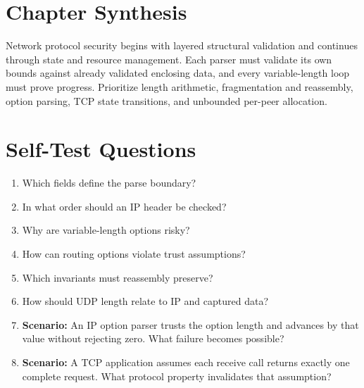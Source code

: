 \documentclass[11pt,letterpaper]{article}
\begin{document}
\section{Chapter Synthesis}
Network protocol security begins with layered structural validation and continues through state and resource management. Each parser must validate its own bounds against already validated enclosing data, and every variable-length loop must prove progress. Prioritize length arithmetic, fragmentation and reassembly, option parsing, TCP state transitions, and unbounded per-peer allocation.
\section{Self-Test Questions}
\begin{enumerate}
\item Which fields define the parse boundary?
\item In what order should an IP header be checked?
\item Why are variable-length options risky?
\item How can routing options violate trust assumptions?
\item Which invariants must reassembly preserve?
\item How should UDP length relate to IP and captured data?
\item \textbf{Scenario:} An IP option parser trusts the option length and advances by that value without rejecting zero. What failure becomes possible?
\item \textbf{Scenario:} A TCP application assumes each receive call returns exactly one complete request. What protocol property invalidates that assumption?
\end{enumerate}
\clearpage
\end{document}

